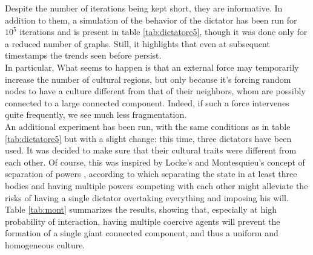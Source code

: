 Despite the number of iterations being kept short, they are informative. In addition to them, a simulation of the behavior of the dictator has been run for $10^5$ iterations and is present in table \ref{tab:dictatore5}, though it was done only for a reduced number of graphs. Still, it highlights that even at subsequent timestamps the trends seen before persist. \\

In particular, What seems to happen is that an external force may temporarily increase the number of cultural regions, but only because it's forcing random nodes to have a culture different from that of their neighbors, whom are possibly connected to a large connected component. Indeed, if such a force intervenes quite frequently, we see much less fragmentation. \\
An additional experiment has been run, with the same conditions as in table \ref{tab:dictatore5} but with a slight change: this time, three dictators have been used. It was decided to make sure that their cultural traits were different from each other. Of course, this was inspired by Locke's and Montesquieu's concept of separation of powers \cite{locke_two_2023}\cite{montesquieu_lo_2005}, according to which separating the state in at least three bodies and having multiple powers competing with each other might alleviate the risks of having a single dictator overtaking everything and imposing his will. Table \ref{tab:mont} summarizes the results, showing that, especially at high probability of interaction, having multiple coercive agents will prevent the formation of a single giant connected component, and thus a uniform and homogeneous culture.


\newpage